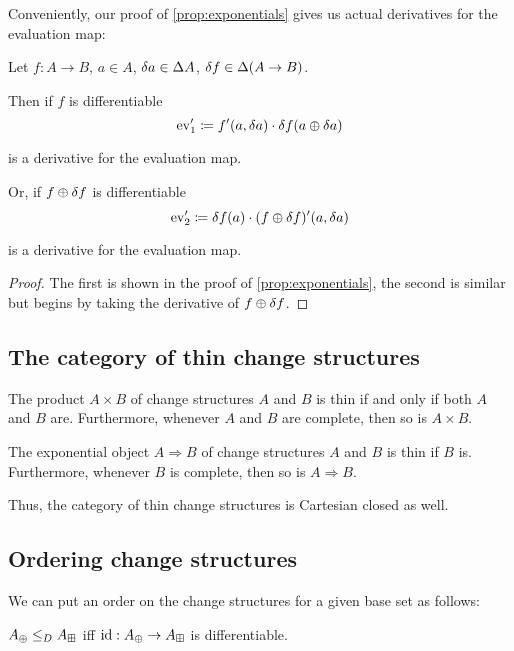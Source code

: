 Conveniently, our proof of \cref{prop:exponentials} gives us actual derivatives for the evaluation map:

\begin{prop}
\label{prop:evDerivatives}
  Let $f: A \rightarrow B$, $a \in A$, $\delta a \in
  \Delta A$, $\delta f \in \Delta (A \rightarrow B)$.

  Then if $f$ is differentiable
  $$\operatorname{ev}'_1 \coloneqq f'(a, \delta a) \cdot \delta f(a \oplus \delta a)$$

  is a derivative for the evaluation map.
  
  Or, if $f \oplus \delta f$ is differentiable
  $$\operatorname{ev}'_2 \coloneqq \delta f(a) \cdot (f \oplus \delta f)'(a, \delta a)$$

  is a derivative for the evaluation map.
\end{prop}
\begin{proof}
  The first is shown in the proof of \cref{prop:exponentials}, the second is
  similar but begins by taking the derivative of $f \oplus \delta f$.
\end{proof}

\subsection{The category of thin change structures}

\begin{prop}
  The product $A \times B$ of change structures $A$ and $B$ is thin if and only if both $A$ and $B$ are.
  Furthermore, whenever $A$ and $B$ are complete, then so is $A \times B$.

  The exponential object $A \Rightarrow B$ of change structures $A$ and $B$ is thin if $B$ is. 
  Furthermore, whenever $B$ is complete, then so is $A \Rightarrow B$.
\end{prop}

Thus, the category of thin change structures is Cartesian closed as well.

\subsection{Ordering change structures}

We can put an order on the change structures for a given base set as follows:

\begin{defn}
  $A_\oplus \leq_D A_\boxplus$ iff $\textrm{id}: A_\oplus \rightarrow A_\boxplus$ is differentiable.
\end{defn}

